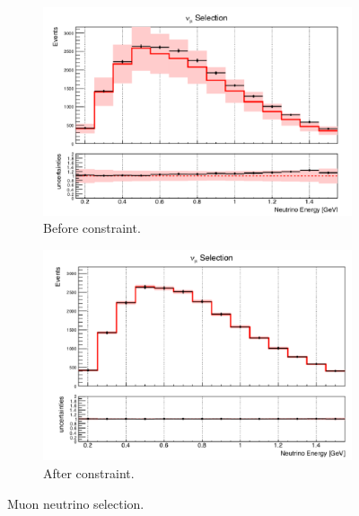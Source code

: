 \begin{figure}[H] 
\begin{center}
    \begin{subfigure}[b]{0.45\textwidth}
    \centering
    \includegraphics[width=1.00\textwidth]{Fakedata/set3/numu_before_constrain.pdf}
    \caption{\label{fig:fakedata:set3:numu_before_constrain} Before constraint.}
    \end{subfigure}
    \begin{subfigure}[b]{0.45\textwidth}
    \centering
    \includegraphics[width=1.00\textwidth]{Fakedata/set3/numu_after_constrain.pdf}
    \caption{\label{fig:fakedata:set3:numu_after_constrain} After constraint.}
    \end{subfigure}
\caption{\label{fig:fakedata:set3:numu_const} Muon neutrino selection.}
\end{center}
\end{figure}

